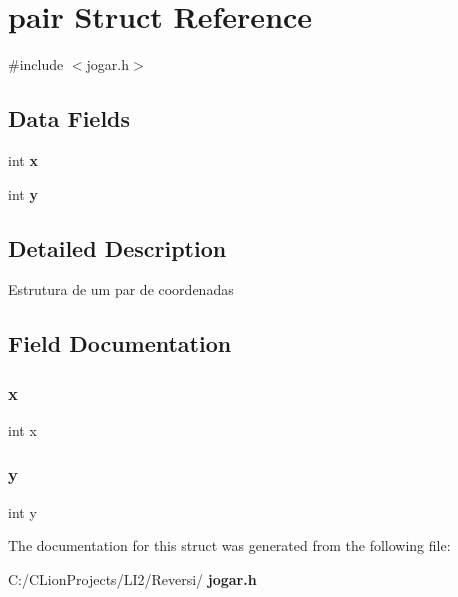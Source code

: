 \section{pair Struct Reference}
\label{structpair}


{\ttfamily \#include $<$jogar.\+h$>$}

\subsection*{Data Fields}
\begin{DoxyCompactItemize}
\item 
int \textbf{ x}
\item 
int \textbf{ y}
\end{DoxyCompactItemize}


\subsection{Detailed Description}
Estrutura de um par de coordenadas 

\subsection{Field Documentation}
\mbox{\label{structpair_a6150e0515f7202e2fb518f7206ed97dc}} 
\subsubsection{x}
{\footnotesize\ttfamily int x}

\mbox{\label{structpair_a0a2f84ed7838f07779ae24c5a9086d33}} 
\subsubsection{y}
{\footnotesize\ttfamily int y}



The documentation for this struct was generated from the following file\+:\begin{DoxyCompactItemize}
\item 
C\+:/\+C\+Lion\+Projects/\+L\+I2/\+Reversi/\textbf{ jogar.\+h}\end{DoxyCompactItemize}
